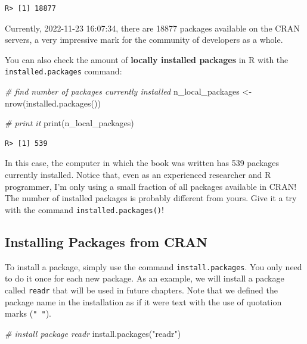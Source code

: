 \documentclass[
  12pt,
]{book}
\newenvironment{Shaded}{\begin{snugshade}}{\end{snugshade}}
\newcommand{\CommentTok}[1]{\textcolor[rgb]{0.37,0.37,0.37}{\textit{#1}}}
\newcommand{\FunctionTok}[1]{\textcolor[rgb]{0,0,0}{#1}}
\newcommand{\NormalTok}[1]{#1}
\newcommand{\OtherTok}[1]{\textcolor[rgb]{0.37,0.37,0.37}{#1}}
\newcommand{\StringTok}[1]{\textcolor[rgb]{0.5,0.5,0.5}{#1}}
\begin{document}
\begin{verbatim}
R> [1] 18877
\end{verbatim}

Currently, 2022-11-23 16:07:34, there are 18877 packages available on the CRAN servers, a very impressive mark for the community of developers as a whole.

You can also check the amount of \textbf{locally installed packages} in R with the \texttt{installed.packages} command: 

\begin{Shaded}
\begin{Highlighting}[]
\CommentTok{\# find number of packages currently installed}
\NormalTok{n\_local\_packages }\OtherTok{\textless{}{-}} \FunctionTok{nrow}\NormalTok{(}\FunctionTok{installed.packages}\NormalTok{())}

\CommentTok{\# print it}
\FunctionTok{print}\NormalTok{(n\_local\_packages)}
\end{Highlighting}
\end{Shaded}

\begin{verbatim}
R> [1] 539
\end{verbatim}

In this case, the computer in which the book was written has 539 packages currently installed. Notice that, even as an experienced researcher and R programmer, I'm only using a small fraction of all packages available in CRAN! The number of installed packages is probably different from yours. Give it a try with the command \texttt{installed.packages()}!

\hypertarget{installing-packages-from-cran}{%
\subsection{Installing Packages from CRAN}\label{installing-packages-from-cran}}

To install a package, simply use the command \texttt{install.packages}. You only need to do it once for each new package. As an example, we will install a package called \texttt{readr} that will be used in future chapters. Note that we defined the package name in the installation as if it were text with the use of quotation marks (\texttt{"\ "}). 

\begin{Shaded}
\begin{Highlighting}[]
\CommentTok{\# install package readr}
\FunctionTok{install.packages}\NormalTok{(}\StringTok{"readr"}\NormalTok{)}
\end{Highlighting}
\end{Shaded}
\end{document}
